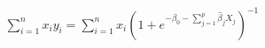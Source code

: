 \documentclass[preview]{standalone}
\begin{document}
\begin{align*}
\sum\limits_{i=1}^{n}x_iy_i = \sum\limits_{i=1}^{n}x_i(1 + e^{-\beta_0 - \sum\limits_{j=1}^{p}\hat{\beta}_jX_j})^{-1}
\end{align*}
\end{document}

